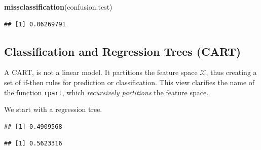 \documentclass[]{book}
\newenvironment{Shaded}{\begin{snugshade}}{\end{snugshade}}
\newcommand{\KeywordTok}[1]{\textcolor[rgb]{0.13,0.29,0.53}{\textbf{{#1}}}}
\newcommand{\DataTypeTok}[1]{\textcolor[rgb]{0.13,0.29,0.53}{{#1}}}
\newcommand{\FloatTok}[1]{\textcolor[rgb]{0.00,0.00,0.81}{{#1}}}
\newcommand{\StringTok}[1]{\textcolor[rgb]{0.31,0.60,0.02}{{#1}}}
\newcommand{\CommentTok}[1]{\textcolor[rgb]{0.56,0.35,0.01}{\textit{{#1}}}}
\newcommand{\NormalTok}[1]{{#1}}
\theoremstyle{definition}
\theoremstyle{definition}
\theoremstyle{remark}
\begin{document}
\begin{Shaded}
\begin{Highlighting}[]
\KeywordTok{missclassification}\NormalTok{(confusion.test)}
\end{Highlighting}
\end{Shaded}

\begin{verbatim}
## [1] 0.06269791
\end{verbatim}

\subsection{Classification and Regression Trees
(CART)}\label{classification-and-regression-trees-cart}

A CART, is not a linear model. It partitions the feature space
\(\mathcal{X}\), thus creating a set of if-then rules for prediction or
classification. This view clarifies the name of the function
\texttt{rpart}, which \emph{recursively partitions} the feature space.

We start with a regression tree.

\begin{Shaded}
\end{Shaded}

\begin{verbatim}
## [1] 0.4909568
\end{verbatim}

\begin{Shaded}
\end{Shaded}

\begin{verbatim}
## [1] 0.5623316
\end{verbatim}
\end{document}
